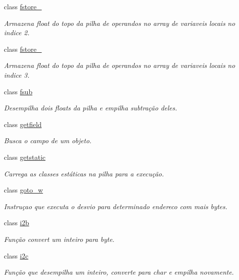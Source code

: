 \begin{DoxyCompactItemize}
class \hyperlink{class_instruction_impl_1_1fstore__2}{fstore\+\_}
\begin{DoxyCompactList}\small\item\em Armazena float do topo da pilha de operandos no array de variaveis locais no indice 2. \end{DoxyCompactList}\item 
class \hyperlink{class_instruction_impl_1_1fstore__3}{fstore\+\_}
\begin{DoxyCompactList}\small\item\em Armazena float do topo da pilha de operandos no array de variaveis locais no indice 3. \end{DoxyCompactList}\item 
class \hyperlink{class_instruction_impl_1_1fsub}{fsub}
\begin{DoxyCompactList}\small\item\em Desempilha dois floats da pilha e empilha subtração deles. \end{DoxyCompactList}\item 
class \hyperlink{class_instruction_impl_1_1getfield}{getfield}
\begin{DoxyCompactList}\small\item\em Busca o campo de um objeto. \end{DoxyCompactList}\item 
class \hyperlink{class_instruction_impl_1_1getstatic}{getstatic}
\begin{DoxyCompactList}\small\item\em Carrega as classes estáticas na pilha para a execução. \end{DoxyCompactList}\item 
class \hyperlink{class_instruction_impl_1_1goto__w}{goto\+\_\+w}
\begin{DoxyCompactList}\small\item\em Instruçao que executa o desvio para determinado endereco com mais bytes. \end{DoxyCompactList}\item 
class \hyperlink{class_instruction_impl_1_1i2b}{i2b}
\begin{DoxyCompactList}\small\item\em Função convert um inteiro para byte. \end{DoxyCompactList}\item 
class \hyperlink{class_instruction_impl_1_1i2c}{i2c}
\begin{DoxyCompactList}\small\item\em Função que desempilha um inteiro, converte para char e empilha novamente. \end{DoxyCompactList}\item 

\end{DoxyCompactItemize}
